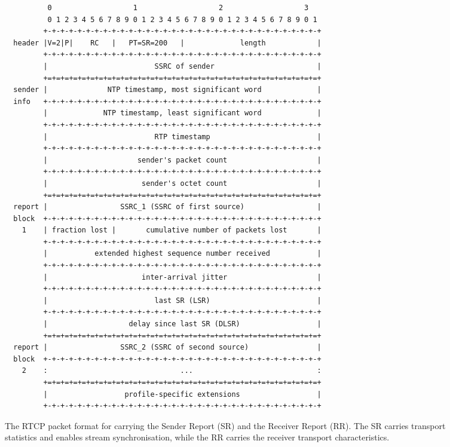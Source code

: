 \begin{figure}[!t]
\begin{spacing}{0.5}
{\footnotesize
\begin{verbatim}
          0                   1                   2                   3
          0 1 2 3 4 5 6 7 8 9 0 1 2 3 4 5 6 7 8 9 0 1 2 3 4 5 6 7 8 9 0 1
         +-+-+-+-+-+-+-+-+-+-+-+-+-+-+-+-+-+-+-+-+-+-+-+-+-+-+-+-+-+-+-+-+
  header |V=2|P|    RC   |   PT=SR=200   |             length            |
         +-+-+-+-+-+-+-+-+-+-+-+-+-+-+-+-+-+-+-+-+-+-+-+-+-+-+-+-+-+-+-+-+
         |                         SSRC of sender                        |
         +=+=+=+=+=+=+=+=+=+=+=+=+=+=+=+=+=+=+=+=+=+=+=+=+=+=+=+=+=+=+=+=+
  sender |              NTP timestamp, most significant word             |
  info   +-+-+-+-+-+-+-+-+-+-+-+-+-+-+-+-+-+-+-+-+-+-+-+-+-+-+-+-+-+-+-+-+
         |             NTP timestamp, least significant word             |
         +-+-+-+-+-+-+-+-+-+-+-+-+-+-+-+-+-+-+-+-+-+-+-+-+-+-+-+-+-+-+-+-+
         |                         RTP timestamp                         |
         +-+-+-+-+-+-+-+-+-+-+-+-+-+-+-+-+-+-+-+-+-+-+-+-+-+-+-+-+-+-+-+-+
         |                     sender's packet count                     |
         +-+-+-+-+-+-+-+-+-+-+-+-+-+-+-+-+-+-+-+-+-+-+-+-+-+-+-+-+-+-+-+-+
         |                      sender's octet count                     |
         +=+=+=+=+=+=+=+=+=+=+=+=+=+=+=+=+=+=+=+=+=+=+=+=+=+=+=+=+=+=+=+=+
  report |                 SSRC_1 (SSRC of first source)                 |
  block  +-+-+-+-+-+-+-+-+-+-+-+-+-+-+-+-+-+-+-+-+-+-+-+-+-+-+-+-+-+-+-+-+
    1    | fraction lost |       cumulative number of packets lost       |
         +-+-+-+-+-+-+-+-+-+-+-+-+-+-+-+-+-+-+-+-+-+-+-+-+-+-+-+-+-+-+-+-+
         |           extended highest sequence number received           |
         +-+-+-+-+-+-+-+-+-+-+-+-+-+-+-+-+-+-+-+-+-+-+-+-+-+-+-+-+-+-+-+-+
         |                      inter-arrival jitter                     |
         +-+-+-+-+-+-+-+-+-+-+-+-+-+-+-+-+-+-+-+-+-+-+-+-+-+-+-+-+-+-+-+-+
         |                         last SR (LSR)                         |
         +-+-+-+-+-+-+-+-+-+-+-+-+-+-+-+-+-+-+-+-+-+-+-+-+-+-+-+-+-+-+-+-+
         |                   delay since last SR (DLSR)                  |
         +=+=+=+=+=+=+=+=+=+=+=+=+=+=+=+=+=+=+=+=+=+=+=+=+=+=+=+=+=+=+=+=+
  report |                 SSRC_2 (SSRC of second source)                |
  block  +-+-+-+-+-+-+-+-+-+-+-+-+-+-+-+-+-+-+-+-+-+-+-+-+-+-+-+-+-+-+-+-+
    2    :                               ...                             :
         +=+=+=+=+=+=+=+=+=+=+=+=+=+=+=+=+=+=+=+=+=+=+=+=+=+=+=+=+=+=+=+=+
         |                  profile-specific extensions                  |
         +-+-+-+-+-+-+-+-+-+-+-+-+-+-+-+-+-+-+-+-+-+-+-+-+-+-+-+-+-+-+-+-+
\end{verbatim}
}
\end{spacing}
\caption{The RTCP packet format for carrying the Sender Report (SR) and
the Receiver Report (RR). The SR carries transport statistics and enables
stream synchronisation, while the RR carries the receiver transport
characteristics.}
\label{fig:3:rtcp.hdr}
\end{figure}


